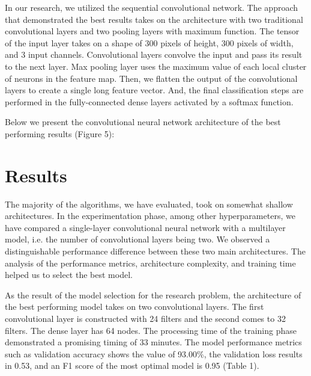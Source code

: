 \documentclass[12pt, twocolumn]{CUP-JNL-PPS}
\begin{document}
In our research, we utilized the sequential convolutional network. The
approach that demonstrated the best results takes on the architecture with two
traditional convolutional layers and two pooling layers with maximum function.
The tensor of the input layer takes on a shape of 300 pixels of height, 300 pixels
of width, and 3 input channels. Convolutional layers convolve the input and
pass its result to the next layer. Max pooling layer uses the maximum value of
each local cluster of neurons in the feature map. Then, we flatten the output
of the convolutional layers to create a single long feature vector. And, the final
classification steps are performed in the fully-connected dense layers activated by
a softmax function.

Below we present the convolutional neural network architecture of the
best performing results (Figure 5):

\vspace{1\baselineskip}
\centerline{
}

\section{Results}

The majority of the algorithms, we have evaluated, took on somewhat
shallow architectures. In the experimentation phase, among other hyperparameters, we have compared a single-layer convolutional neural network with a multilayer model, i.e. the number of convolutional layers being two. We observed a distinguishable performance difference between these two main architectures.
The analysis of the performance metrics, architecture complexity, and training time helped us to select the best model.

As the result of the model selection for the research problem, the
architecture of the best performing model takes on two convolutional layers. The
first convolutional layer is constructed with 24 filters and the second comes to 32
filters. The dense layer has 64 nodes. The processing time of the training phase
demonstrated a promising timing of 33 minutes. The model performance metrics
such as validation accuracy shows the value of 93.00\%, the validation loss results
in 0.53, and an F1 score of the most optimal model is 0.95 (Table 1).
\vspace{1\baselineskip}
\end{document}

